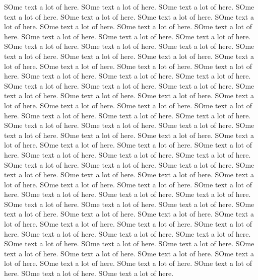 \documentclass[a4paper]{article}
\begin{document}
    SOme text a lot of here.
    SOme text a lot of here.
    SOme text a lot of here.
    SOme text a lot of here.
    SOme text a lot of here.
    SOme text a lot of here.
    SOme text a lot of here.
    SOme text a lot of here.
    SOme text a lot of here.
    SOme text a lot of here.
    SOme text a lot of here.
    SOme text a lot of here.
    SOme text a lot of here.
    SOme text a lot of here.
    SOme text a lot of here.
    SOme text a lot of here.
    SOme text a lot of here.
    SOme text a lot of here.
    SOme text a lot of here.
    SOme text a lot of here.
    SOme text a lot of here.
    SOme text a lot of here.
    SOme text a lot of here.
    SOme text a lot of here.
    SOme text a lot of here.
    SOme text a lot of here.
    SOme text a lot of here.
    SOme text a lot of here.
    SOme text a lot of here.
    SOme text a lot of here.
    SOme text a lot of here.
    SOme text a lot of here.
    SOme text a lot of here.
    SOme text a lot of here.
    SOme text a lot of here.
    SOme text a lot of here.
    SOme text a lot of here.
    SOme text a lot of here.
    SOme text a lot of here.
    SOme text a lot of here.
    SOme text a lot of here.
    SOme text a lot of here.
    SOme text a lot of here.
    SOme text a lot of here.
    SOme text a lot of here.
    SOme text a lot of here.
    SOme text a lot of here.
    SOme text a lot of here.
    SOme text a lot of here.
    SOme text a lot of here.
    SOme text a lot of here.
    SOme text a lot of here.
    SOme text a lot of here.
    SOme text a lot of here.
    SOme text a lot of here.
    SOme text a lot of here.
    SOme text a lot of here.
    SOme text a lot of here.
    SOme text a lot of here.
    SOme text a lot of here.
    SOme text a lot of here.
    SOme text a lot of here.
    SOme text a lot of here.
    SOme text a lot of here.
    SOme text a lot of here.
    SOme text a lot of here.
    SOme text a lot of here.
    SOme text a lot of here.
    SOme text a lot of here.
    SOme text a lot of here.
    SOme text a lot of here.
    SOme text a lot of here.
    SOme text a lot of here.
    SOme text a lot of here.
    SOme text a lot of here.
    SOme text a lot of here.
    SOme text a lot of here.
    SOme text a lot of here.
    SOme text a lot of here.
    SOme text a lot of here.
    SOme text a lot of here.
    SOme text a lot of here.
    SOme text a lot of here.
    SOme text a lot of here.
    SOme text a lot of here.
    SOme text a lot of here.
    SOme text a lot of here.
    SOme text a lot of here.
    SOme text a lot of here.
    SOme text a lot of here.
\end{document}
